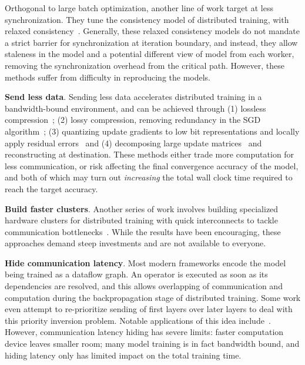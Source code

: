 Orthogonal to large batch optimization, another line of work target at less synchronization. They tune the consistency model of distributed training, with relaxed consistency~\cite{DBLP:journals/corr/DaiKWHGX14,SSP,BSP,Wei:2015:MCC:2806777.2806778,Litz,xie2018orpheus,wang2018adaptive}. Generally, these relaxed consistency models do not mandate a strict barrier for synchronization at iteration boundary, and instead, they allow staleness in the model and a potential different view of model from each worker, removing the synchronization overhead from the critical path. However, these methods suffer from difficulty in reproducing the models. 

\noindent\textbf{Send less data}. Sending less data accelerates distributed training in a bandwidth-bound environment, and can be achieved through (1) lossless compression~\cite{burtscher2009fpc}; (2) lossy compression, removing redundancy in the SGD algorithm~\cite{lin2017deep}; (3) quantizing update gradients to low bit representations and locally apply residual errors~\cite{cntk1bt, lim20183lc} and (4) decomposing large update matrices~\cite{projectAdam,poseidon,xie2015distributed} and reconstructing at destination. These methods either trade more computation for less communication, or risk affecting the final convergence accuracy of the model, and both of which may turn out \textit{increasing} the total wall clock time required to reach the target accuracy.

\noindent\textbf{Build faster clusters}. Another series of work involves building specialized hardware clusters for distributed training with quick interconnects to tackle communication bottlenecks~\cite{DBLP:journals/corr/abs-1711-00489, You:2018:ITM:3225058.3225069, DBLP:journals/corr/abs-1711-04325,jia2018highly,DBLP:journals/corr/abs-1811-05233,sun2019optimizing, ImageNetIn1Hour, firecaffe}. While the results have been encouraging, these approaches demand steep investments and are not available to everyone.

\noindent\textbf{Hide communication latency}. Most modern frameworks encode the model being trained as a dataflow graph. An operator is executed as soon as its dependencies are resolved, and this allows overlapping of communication and computation during the backpropagation stage of distributed training. Some work even attempt to re-prioritize sending of first layers over later layers to deal with this priority inversion problem. Notable applications of this idea include~\cite{hashemi2018tictac, prioritybased, poseidon, 10.1145/3341301.3359642}. However, communication latency hiding has severe limits: faster computation device leaves smaller room; many model training is in fact bandwidth bound, and hiding latency only has limited impact on the total training time.

